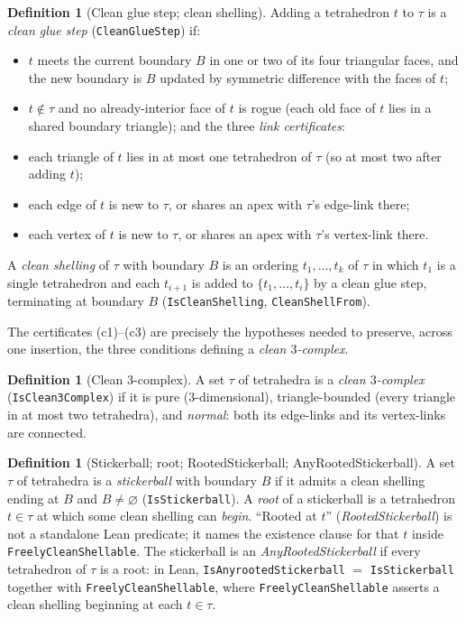 \documentclass[11pt]{article}
\theoremstyle{plain}
\theoremstyle{definition}
\newtheorem{definition}[theorem]{Definition}
\theoremstyle{remark}
\newcommand{\code}[1]{\texttt{#1}}
\begin{document}
\begin{definition}[Clean glue step; clean shelling]\label{def:clean}
Adding a tetrahedron $t$ to $\tau$ is a \emph{clean glue step} (\code{CleanGlueStep}) if:
\begin{itemize}
\item[(a)] $t$ meets the current boundary $B$ in one or two of its four triangular faces,
and the new boundary is $B$ updated by symmetric difference with the faces of $t$;
\item[(b)] $t\notin\tau$ and no already-interior face of $t$ is rogue (each old face of $t$
lies in a shared boundary triangle); and the three \emph{link certificates}:
\item[(c1)] each triangle of $t$ lies in at most one tetrahedron of $\tau$ (so at most two
after adding $t$);
\item[(c2)] each edge of $t$ is new to $\tau$, or shares an apex with $\tau$'s edge-link there;
\item[(c3)] each vertex of $t$ is new to $\tau$, or shares an apex with $\tau$'s vertex-link there.
\end{itemize}
A \emph{clean shelling} of $\tau$ with boundary $B$ is an ordering $t_1,\dots,t_k$ of $\tau$
in which $t_1$ is a single tetrahedron and each $t_{i+1}$ is added to $\{t_1,\dots,t_i\}$ by
a clean glue step, terminating at boundary $B$ (\code{IsCleanShelling},
\code{CleanShellFrom}).
\end{definition}

The certificates (c1)--(c3) are precisely the hypotheses needed to preserve, across one
insertion, the three conditions defining a \emph{clean $3$-complex}.

\begin{definition}[Clean $3$-complex]\label{def:clean3}
A set $\tau$ of tetrahedra is a \emph{clean $3$-complex} (\code{IsClean3Complex}) if it is
pure ($3$-dimensional), triangle-bounded (every triangle in at most two tetrahedra), and
\emph{normal}: both its edge-links and its vertex-links are connected.
\end{definition}

\begin{definition}[Stickerball; root; RootedStickerball; AnyRootedStickerball]\label{def:sb}
A set $\tau$ of tetrahedra is a \emph{stickerball} with boundary $B$ if it admits a clean
shelling ending at $B$ and $B\neq\varnothing$ (\code{IsStickerball}).
A \emph{root} of a stickerball is a tetrahedron $t\in\tau$ at which some clean shelling can
\emph{begin}. ``Rooted at $t$'' (\emph{RootedStickerball}) is not a standalone Lean predicate; it
names the existence clause for that $t$ inside \code{FreelyCleanShellable}. The stickerball is an
\emph{AnyRootedStickerball} if every tetrahedron of $\tau$ is a root: in Lean,
\code{IsAnyrootedStickerball} $=$ \code{IsStickerball} together with \code{FreelyCleanShellable},
where \code{FreelyCleanShellable} asserts a clean shelling beginning at each $t\in\tau$.
\end{definition}
\end{document}
